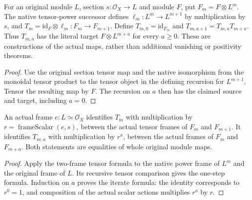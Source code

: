 \begin{definition}
\label{def:cech-line-native-transitions}
\leanok
For an original module $L$, section $s:\mathcal O_X\to L$ and module
$F$, put $F_m=F\otimes L^m$. The native tensor-power successor defines
$\ell_m:L^m\to L^{m+1}$ by multiplication by $s$, and
$T_m=\mathrm{id}_F\otimes\ell_m:F_m\to F_{m+1}$.
Define $T_{m,0}=\mathrm{id}_{F_m}$ and
$T_{m,a+1}=T_{m,a}T_{m+a}$. Thus $T_{m,a}$ has the literal target
$F\otimes L^{m+a}$ for every $a\geq0$.
These are constructions of the actual maps, rather than additional
vanishing or positivity theorems.
\end{definition}
\begin{proof}
Use the original section tensor map and the native isomorphism from the
monoidal tensor product to the tensor object in the defining recursion
for $L^{m+1}$. Tensor the resulting map by $F$. The recursion on $a$
then has the claimed source and target, including $a=0$.
\end{proof}

\begin{lemma}
\label{lem:cech-line-native-transition-frame}
\leanok
An actual frame $e:L\simeq\mathcal O_X$ identifies $T_m$ with
multiplication by $r=\operatorname{frameScalar}(e,s)$, between the
actual tensor frames of $F_m$ and $F_{m+1}$. It identifies $T_{m,a}$
with multiplication by $r^a$, between the actual frames of $F_m$ and
$F_{m+a}$. Both statements are equalities of whole original module maps.
\end{lemma}
\begin{proof}
Apply the two-frame tensor formula to the native power frame of $L^m$
and the original frame of $L$. Its recursive tensor comparison gives
the one-step formula. Induction on $a$ proves the iterate formula:
the identity corresponds to $r^0=1$, and composition of the actual
scalar actions multiplies $r^a$ by $r$.
\end{proof}


